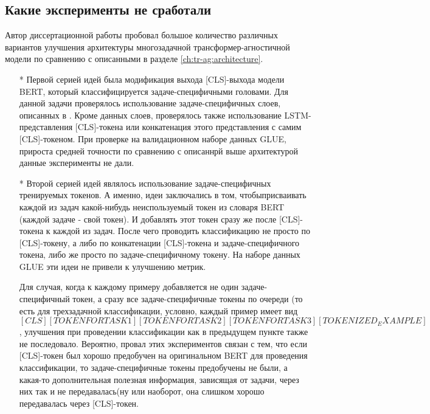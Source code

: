 \subsection{Какие эксперименты не сработали}\label{ch:tr-ag:failed_attempts} 
Автор диссертационной работы пробовал большое количество различных вариантов улучшения архитектуры многозадачной трансформер-агностичной модели по сравнению с описанными в разделе \ref{ch:tr-ag:architecture}. 
\begin{itemize} 
 \item[*] Первой серией идей была модификация выхода [CLS]-выхода модели BERT, который классифицируется задаче-специфичными головами. Для данной задачи проверялось использование задаче-специфичных слоев, описанных в \cite{GhostBERT2021, TaskEmbedded2021, el-nouby2021xcit}. Кроме данных слоев, проверялось также использование LSTM-представления [CLS]-токена или конкатенация этого представления с самим [CLS]-токеном. При проверке на валидационном наборе данных GLUE, прироста средней точности по сравнению с описаннрй выше архитектурой данные эксперименты не дали. 
\item[*] Второй серией идей являлось использование задаче-специфичных тренируемых токенов. А именно, идеи заключались в том, чтобыприсваивать каждой из задач какой-нибудь неиспользуемый токен из словаря BERT (каждой задаче - свой токен). И добавлять этот токен сразу же после [CLS]-токена к каждой из задач. После чего проводить классификацию не просто по [CLS]-токену, а либо по конкатенации [CLS]-токена и задаче-специфичного токена, либо же просто по задаче-специфичному токену. На наборе данных GLUE эти идеи не привели к улучшению метрик.

 Для случая, когда к каждому примеру добавляется не один задаче-специфичный токен, а сразу все задаче-специфичные токены по очереди (то есть для трехзадачной классификации, условно, каждый пример имеет вид \textit{$[CLS] [TOKEN FOR TASK1] [TOKEN FOR TASK2] [TOKEN FOR TASK3] [TOKENIZED_EXAMPLE]$}, улучшения при проведении классификации как в предыдущем пункте также не последовало. 
Вероятно, провал этих экспериментов связан с тем, что если [CLS]-токен был хорошо предобучен на оригинальном BERT для проведения классификации, то задаче-специфичные токены предобучены не были, а какая-то дополнительная полезная информация, зависящая от задачи, через них так и не передавалась(ну или наоборот, она слишком хорошо передавалась через [CLS]-токен. 


\end{itemize}
